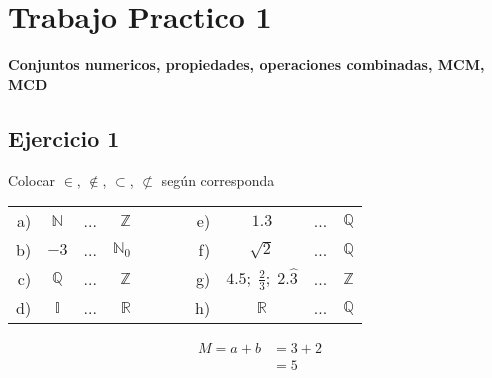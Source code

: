 \chapter{Trabajo Practico 1}

\textbf{Conjuntos numericos, propiedades, operaciones combinadas, MCM, MCD}

\section{Ejercicio 1}

Colocar $\in$, $\notin$, $\subset$, $\not\subset$ según corresponda


\begin{tabular}{rccr|cccrccr}
	\centering
	a) & $\mathbb N$ & ... & $ \mathbb Z  $ &  &  &  & e) & $      1.3                            $ & ... & $ \mathbb Q  $ \\
	b) & $       -3$ & ... & $ \mathbb N_0$ &  &  &  & f) & $\sqrt{2}                             $ & ... & $ \mathbb Q  $ \\
	c) & $\mathbb Q$ & ... & $ \mathbb Z  $ &  &  &  & g) & $4.5; \; \frac{2}{3}; \; 2.\widehat{3}$ & ... & $ \mathbb Z  $ \\
	d) & $\mathbb I$ & ... & $ \mathbb R  $ &  &  &  & h) & $\mathbb R                            $ & ... & $ \mathbb Q  $ \\
\end{tabular}

\begin{equation}
	\begin{split}
		M=a+b &= 3+2 \\
		      &= 5 \\
	\end{split}
\end{equation}


